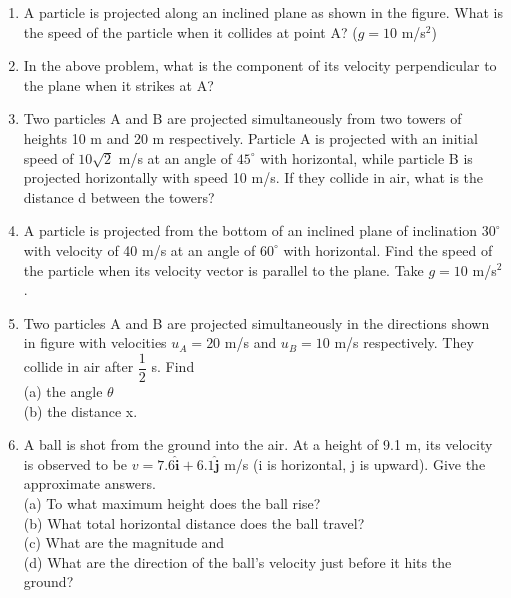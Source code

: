 \documentclass{article}
\renewcommand{\frac}[2]{\dfrac{#1}{#2}}
\begin{document}
\begin{enumerate}
    \item A particle is projected along an inclined plane as shown in the figure. What is the speed of the particle when it collides at point A? ($g = 10$ m/s$^2$)
    \begin{center}
    \end{center}

    \item In the above problem, what is the component of its velocity perpendicular to the plane when it strikes at A?

    \item Two particles A and B are projected simultaneously from two towers of heights 10 m and 20 m respectively. Particle A is projected with an initial speed of $10\sqrt{2}$ m/s at an angle of $45^\circ$ with horizontal, while particle B is projected horizontally with speed 10 m/s. If they collide in air, what is the distance d between the towers?
    \begin{center}
    \end{center}


    \item A particle is projected from the bottom of an inclined plane of inclination $30^\circ$ with velocity of 40 m/s at an angle of $60^\circ$ with horizontal. Find the speed of the particle when its velocity vector is parallel to the plane. Take $g = 10$ m/s$^2$.

    
    
    \item Two particles A and B are projected simultaneously in the directions shown in figure with velocities $u_A = 20$ m/s and $u_B = 10$ m/s respectively. They collide in air after $\frac{1}{2}$ s. Find \\
    (a) the angle $\theta$ \\
    (b) the distance x.
    \begin{center}
    \end{center}

    \item A ball is shot from the ground into the air. At a height of 9.1 m, its velocity is observed to be $v = 7.6\boldsymbol{\hat{i}} + 6.1\boldsymbol{\hat{j}}$ m/s (i is horizontal, j is upward). Give the approximate answers. \\
    (a) To what maximum height does the ball rise? \\
    (b) What total horizontal distance does the ball travel? \\
    (c) What are the magnitude and \\
    (d) What are the direction of the ball’s velocity just before it hits the ground?


\end{enumerate}
\end{document}

